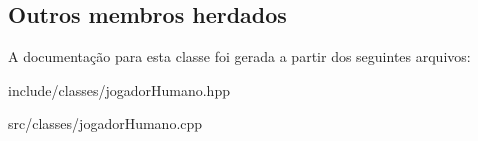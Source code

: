 \subsection*{Outros membros herdados}


A documentação para esta classe foi gerada a partir dos seguintes arquivos\+:\begin{DoxyCompactItemize}
\item 
include/classes/jogador\+Humano.\+hpp\item 
src/classes/jogador\+Humano.\+cpp\end{DoxyCompactItemize}
